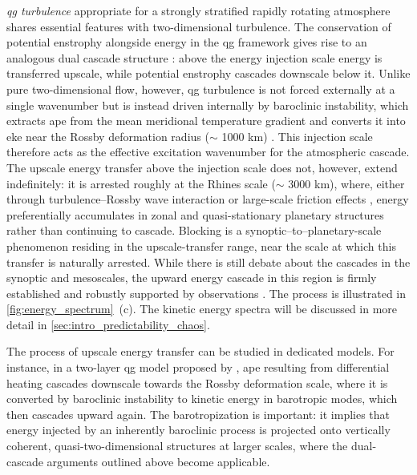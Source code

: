 \emph{\Gls{qg} turbulence} appropriate for a strongly stratified rapidly
rotating atmosphere shares essential features with
two-dimensional turbulence. The conservation of potential enstrophy alongside
energy in the \gls{qg} framework gives rise to an analogous dual cascade
structure \parencite{charneyGeostrophicTurbulence1971}: above the energy
injection scale energy is transferred upscale, while potential enstrophy
cascades downscale below it. Unlike pure two-dimensional flow, however,
\gls{qg} turbulence is not forced externally at a single wavenumber but is
instead driven internally by baroclinic instability, which extracts \gls{ape}
from the mean meridional temperature gradient and converts it
into \gls{eke} near the Rossby deformation radius ($\sim$ 1000 km)
\parencite{frederiksenUnifiedThreedimensionalInstability1982,
    augierNewFormulationSpectral2013}. This injection
scale therefore acts as the effective excitation wavenumber for the
atmospheric cascade. The upscale energy transfer above the injection
scale does not, however, extend indefinitely: it is arrested roughly at the
Rhines scale ($\sim$ 3000 km), where, either through turbulence--Rossby
wave interaction \parencite{rhinesWavesTurbulenceBetaplane1975}
or large-scale friction effects \parencite{sukorianskyArrestInverseEnergy2007},
energy preferentially accumulates in zonal and quasi-stationary planetary
structures rather than continuing to cascade. Blocking is a
synoptic--to--planetary-scale phenomenon residing in the upscale-transfer range,
near the scale at which this transfer is naturally arrested. While there is
still debate about the cascades in the synoptic and mesoscales, the
upward energy cascade in this region is firmly established and robustly supported
by observations \parencite{boerLargescaleTwodimensionalTurbulence1983,
    burgessTropospheretoStratosphereTransitionKinetic2013}. The
process is illustrated in \cref{fig:energy_spectrum}~(c). The kinetic energy
spectra will be discussed in more detail in \cref{sec:intro_predictability_chaos}.

The process of upscale energy transfer can be studied in dedicated models.
For instance, in a two-layer
\gls{qg} model proposed by
\textcite{salmonTwolayerQuasigeostrophicTurbulence1978}, \gls{ape} resulting
from differential heating cascades downscale towards the
Rossby deformation scale, where it is converted by baroclinic instability to
kinetic energy in barotropic modes, which then cascades
upward again. The barotropization is important: it implies that energy
injected by an inherently baroclinic process is projected
onto vertically coherent, quasi-two-dimensional structures at larger scales,
where the dual-cascade arguments outlined above become applicable.

